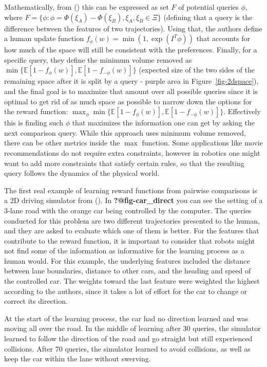 \documentclass[
  letterpaper,
  numbers=noenddot,
  DIV=11]{scrreprt}
\theoremstyle{plain}
\theoremstyle{definition}
\theoremstyle{remark}
\begin{document}
Mathematically, from () this can be expressed as set \(F\) of potential queries \(\phi\),
where
\(F = \{\phi: \phi = \Phi(\xi_A) - \Phi(\xi_B), \xi_A, \xi_B \in \Xi\}\)
(defining that a query is the difference between the features of two
trajectories). Using that, the authors define a human update function
\(f_{\phi}(w) = \min(1, \exp(I^T\phi))\) that accounts for how much of
the space will still be consistent with the preferences. Finally, for a
specific query, they define the minimum volume removed as
\(\min\{\mathbb{E}[1 - f_{\phi}(w)], \mathbb{E}[1 - f_{-\phi}(w)]\}\)
(expected size of the two sides of the remaining space after it is split
by a query - purple area in Figure~\ref{fig-2dspace}), and the final
goal is to maximize that amount over all possible queries since it is
optimal to get rid of as much space as possible to narrow down the
options for the reward function:
\(\max_{\phi} \min\{ \mathbb{E}[1 - f_{\phi}(w)], \mathbb{E}[1 - f_{-\phi}(w)]\}\).
Effectively this is finding such \(\phi\) that maximizes the information
one can get by asking the next comparison query. While this approach
uses minimum volume removed, there can be other metrics inside the
\(\max\) function. Some applications like movie recommendations do not
require extra constraints, however in robotics one might want to add
more constraints that satisfy certain rules, so that the resulting query
follows the dynamics of the physical world.

The first real example of learning reward functions from pairwise
comparisons is a 2D driving simulator from
(). In
\textbf{?@fig-car\_direct} you can see the setting of a 3-lane road with
the orange car being controlled by the computer. The queries conducted
for this problem are two different trajectories presented to the human,
and they are asked to evaluate which one of them is better. For the
features that contribute to the reward function, it is important to
consider that robots might not find some of the information as
informative for the learning process as a human would. For this example,
the underlying features included the distance between lane boundaries,
distance to other cars, and the heading and speed of the controlled car.
The weights toward the last feature were weighted the highest according
to the authors, since it takes a lot of effort for the car to change or
correct its direction.

At the start of the learning process, the car had no direction learned
and was moving all over the road. In the middle of learning after 30
queries, the simulator learned to follow the direction of the road and
go straight but still experienced collisions. After 70 queries, the
simulator learned to avoid collisions, as well as keep the car within
the lane without swerving.
\end{document}
